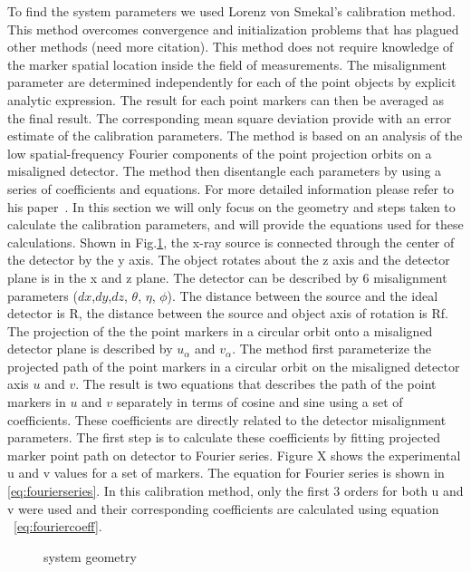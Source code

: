 To find the system parameters we used Lorenz von Smekal's calibration method. This method overcomes convergence and initialization problems that has plagued other methods (need more citation).  This method does not require knowledge of the marker spatial location inside the field of measurements.  The misalignment parameter are determined independently for each of the point objects by explicit analytic expression.  The result for each point markers can then be averaged as the final result.  The corresponding mean square deviation provide with an error estimate of the calibration parameters.  The method is based on an analysis of the low spatial-frequency Fourier components of the point projection orbits on a misaligned detector.  The method then disentangle each parameters by using a series of coefficients and equations.  For more detailed information please refer to his paper~\citep{Smekal2004}.  In this section we will only focus on the geometry and steps taken to calculate the calibration parameters, and will provide the equations used for these calculations.  Shown in Fig.\ref{fig:system_geometry}, the x-ray source is connected through the center of the detector by the y axis.  The object rotates about the z axis and the detector plane is in the x and z plane.  The detector can be described by 6 misalignment parameters ($dx$,$dy$,$dz$, $\theta$, $\eta$, $\phi$).  The distance between the source and the ideal detector is R, the distance between the source and object axis of rotation is Rf.  The projection of the the point markers in a circular orbit onto a misaligned detector plane is described by $u_{\alpha}$ and $v_{\alpha}$.  The method first parameterize the projected path of the point markers in a circular orbit on the misaligned detector axis $u$ and $v$.  The result is two equations that describes the path of the point markers in $u$ and $v$ separately in terms of cosine and sine using a set of coefficients.  These coefficients are directly related to the detector misalignment parameters.  The first step is to calculate these coefficients by fitting projected marker point path on detector to Fourier series.  Figure X shows the experimental u and v values for a set of markers.  The equation for Fourier series is shown in \ref{eq:fourierseries}.  In this calibration method, only the first 3 orders for both u and v were used and their corresponding coefficients are calculated using equation ~\ref{eq:fouriercoeff}. 

\begin{figure}
\centering
{}
\caption{system geometry}
\label{fig:system_geometry}
\end{figure}

